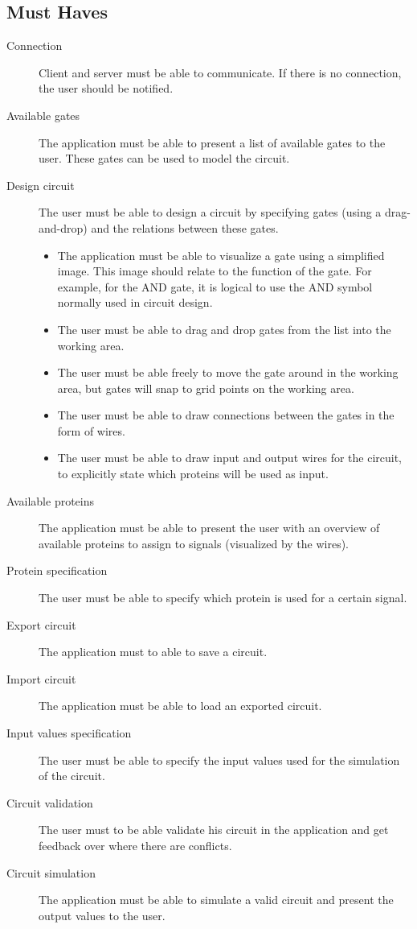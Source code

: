 \documentclass[a4paper]{article}
\begin{document}
\subsection{Must Haves}
\begin{description}
\item[Connection] Client and server must be able to communicate. If there is no connection, the user should be notified.
\item[Available gates] The application must be able to present a list of available gates to the user. These gates can be used to model the circuit.
\item[Design circuit] The user must be able to design a circuit by specifying gates (using a drag-and-drop) and the relations between these gates.
	\begin{itemize}
	\item The application must be able to visualize a gate using a simplified image. This image should relate to the function of the gate. For example, for the AND gate, it is logical to use the AND symbol normally used in circuit design.
	\item The user must be able to drag and drop gates from the list into the working area.
	\item The user must be able freely to move the gate around in the working area, but gates will snap to grid points on the working area.
	\item The user must be able to draw connections between the gates in the form of wires.
	\item The user must be able to draw input and output wires for the circuit, to explicitly state which proteins will be used as input.
	\end{itemize}
\item[Available proteins] The application must be able to present the user with an overview of available proteins to assign to signals (visualized by the wires).
\item[Protein specification] The user must be able to specify which protein is used for a certain signal.
\item[Export circuit] The application must to able to save a circuit.
\item[Import circuit] The application must be able to load an exported circuit.
\item[Input values specification] The user must be able to specify the input values used for the simulation of the circuit.
\item[Circuit validation] The user must to be able validate his circuit in the application and get feedback over where there are conflicts.
\item[Circuit simulation] The application must be able to simulate a valid circuit and present the output values to the user.
\end{description}
\end{document}
